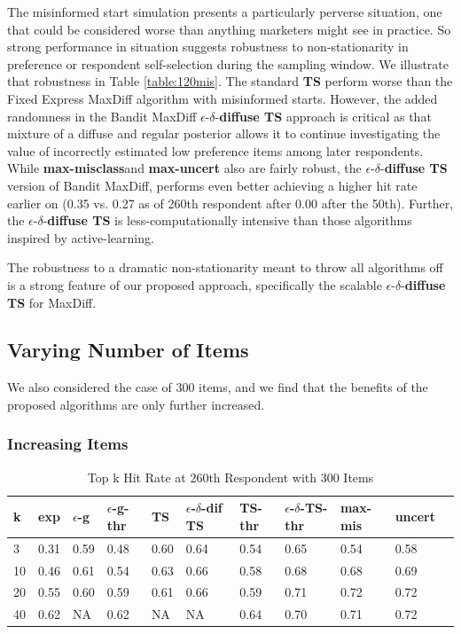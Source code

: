 \documentclass[nonblindrev]{informs3}
\newcommand{\mismin}{\textbf{max-misclass}}
\newcommand{\ts}{\textbf{TS} }
\newcommand{\edts}{$\epsilon$-$\delta$-\textbf{diffuse TS} }
\newcommand{\uncert}{\textbf{max-uncert} }
\newcommand{\fixedexpressS}{\textbf{exp}}
\newcommand{\egreedyS}{$\epsilon$-\textbf{g}}
\newcommand{\egreedythresS}{$\epsilon$-\textbf{g-thr}}
\newcommand{\misminS}{\textbf{max-mis}}
\newcommand{\tsS}{\textbf{TS} }
\newcommand{\edtsS}{$\epsilon$-$\delta$-\textbf{dif TS} }
\newcommand{\tsthresS}{\textbf{TS-thr} }
\newcommand{\edtsthresS}{$\epsilon$-$\delta$-\textbf{TS-thr} }
\newcommand{\uncertS}{\textbf{uncert} }
\begin{document}
The misinformed start simulation presents a particularly perverse situation, one that could be considered worse than anything marketers might see in practice. So strong performance in situation suggests robustness to non-stationarity in preference or respondent self-selection during the sampling window. We illustrate that robustness in Table \ref{table:120mis}. The standard \ts perform worse than the Fixed Express MaxDiff algorithm with misinformed starts. However, the added randomness in the Bandit MaxDiff \edts approach is critical as that mixture of a diffuse and regular posterior allows it to continue investigating the value of incorrectly estimated low preference items among later respondents. While \mismin and \uncert also are fairly robust, the \edts version of Bandit MaxDiff, performs even better achieving a higher hit rate earlier on (0.35 vs. 0.27 as of 260th respondent after 0.00 after the 50th). Further, the \edts is less-computationally intensive than those algorithms inspired by active-learning.

The robustness to a dramatic non-stationarity meant to throw all algorithms off is a strong feature of our proposed approach, specifically the scalable \edts for MaxDiff. 

\subsection{Varying Number of Items}


We also considered the case of 300 items, and we find that the benefits of the proposed algorithms are only further increased.


\subsubsection{Increasing Items}
\begin{table}
\caption{Top k Hit Rate at 260th Respondent with 300 Items}
\begin{center}
\begin{tabular}{lllllllllll}
\hline   k &  \fixedexpressS & \egreedyS&\egreedythresS&\tsS&\edtsS&\tsthresS&\edtsthresS& \misminS& \uncertS \\ \hline 
3&   0.31 &   0.59 & 0.48 & 0.60 &  0.64 & 0.54 & 0.65 & 0.54 &   0.58 \\ 
10 & 0.46 &   0.61 & 0.54 & 0.63  & 0.66 & 0.58 & 0.68 & 0.68  &   0.69 \\ 
20 & 0.55 &   0.60 & 0.59 &  0.61 & 0.66 & 0.59 & 0.71 &       0.72 &   0.72\\ 
40 & 0.62 &   NA & 0.62 & NA &  NA & 0.64 & 0.70 & 0.71 & 0.72 \end{tabular}
\end{center}
\label{table:300at260}
\end{table}
\end{document}
